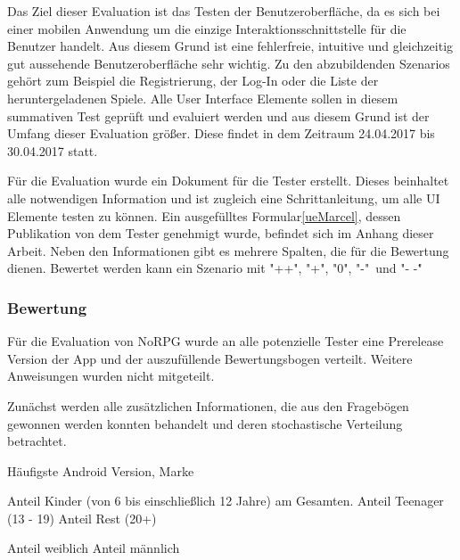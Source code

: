 			Das Ziel dieser Evaluation ist das Testen der Benutzeroberfläche, da es sich bei einer mobilen Anwendung um die einzige Interaktionsschnittstelle für die Benutzer handelt. Aus diesem Grund ist eine fehlerfreie, intuitive und gleichzeitig gut aussehende Benutzeroberfläche sehr wichtig. Zu den abzubildenden Szenarios gehört zum Beispiel die Registrierung, der Log-In oder die Liste der heruntergeladenen Spiele. Alle User Interface Elemente sollen in diesem summativen Test geprüft und evaluiert werden und aus diesem Grund ist der Umfang dieser Evaluation größer. Diese findet in dem Zeitraum 24.04.2017 bis 30.04.2017 statt.
		
			Für die Evaluation wurde ein Dokument für die Tester erstellt. Dieses beinhaltet alle notwendigen Information und ist zugleich eine Schrittanleitung, um alle UI Elemente testen zu können. Ein ausgefülltes Formular\ref{ueMarcel}, dessen Publikation von dem Tester genehmigt wurde, befindet sich im Anhang dieser Arbeit. Neben den Informationen gibt es mehrere Spalten, die für die Bewertung dienen. Bewertet werden kann ein Szenario mit "++", "+", "0", "\--"\ und "\-- -"\. 
		
		\subsubsection{Bewertung}
			Für die Evaluation von NoRPG wurde an alle potenzielle Tester eine Prerelease Version der App und der auszufüllende Bewertungsbogen verteilt. Weitere Anweisungen wurden nicht mitgeteilt.
			
			Zunächst werden alle zusätzlichen Informationen, die aus den Fragebögen gewonnen werden konnten behandelt und deren stochastische Verteilung betrachtet.
			
			Häufigste Android Version, Marke
			
			Anteil Kinder (von 6 bis einschließlich 12 Jahre) am Gesamten.
			Anteil Teenager (13 - 19)
			Anteil Rest (20+)
			
			Anteil weiblich
			Anteil männlich
			
